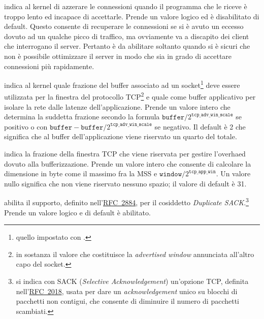 \begin{basedescript}{\desclabelwidth{2.2cm}\desclabelstyle{\nextlinelabel}}

\item[\sysctlrelfiled{net/ipv4}{tcp\_abort\_on\_overflow}] indica al
  kernel di azzerare le connessioni quando il programma che le riceve è troppo
  lento ed incapace di accettarle. Prende un valore logico ed è disabilitato
  di default.  Questo consente di recuperare le connessioni se si è avuto un
  eccesso dovuto ad un qualche picco di traffico, ma ovviamente va a discapito
  dei client che interrogano il server. Pertanto è da abilitare soltanto
  quando si è sicuri che non è possibile ottimizzare il server in modo che sia
  in grado di accettare connessioni più rapidamente.

\item[\sysctlrelfiled{net/ipv4}{tcp\_adv\_win\_scale}] indica al kernel quale
  frazione del buffer associato ad un socket\footnote{quello impostato con
    .} deve essere utilizzata per la
  finestra del protocollo TCP\footnote{in sostanza il valore che costituisce
    la \textit{advertised window} annunciata all'altro capo del socket.} e
  quale come buffer applicativo per isolare la rete dalle latenze
  dell'applicazione.  Prende un valore intero che determina la suddetta
  frazione secondo la formula
  $\texttt{buffer}/2^\texttt{tcp\_adv\_win\_scale}$ se positivo o con
  $\texttt{buffer}-\texttt{buffer}/2^\texttt{tcp\_adv\_win\_scale}$ se
  negativo.  Il default è 2 che significa che al buffer dell'applicazione
  viene riservato un quarto del totale.

\item[\sysctlrelfiled{net/ipv4}{tcp\_app\_win}] indica la frazione della
  finestra TCP che viene riservata per gestire l'overhaed dovuto alla
  bufferizzazione. Prende un valore intero che consente di calcolare la
  dimensione in byte come il massimo fra la MSS e
  $\texttt{window}/2^\texttt{tcp\_app\_win}$. Un valore nullo significa che
  non viene riservato nessuno spazio; il valore di default è 31.


\item[\sysctlrelfiled{net/ipv4}{tcp\_dsack}] abilita il supporto,
  definito nell'\href{http://www.ietf.org/rfc/rfc2884.txt}{RFC~2884}, per il
  cosiddetto \textit{Duplicate SACK}.\footnote{si indica con SACK
    (\textit{Selective Acknowledgement}) un'opzione TCP, definita
    nell'\href{http://www.ietf.org/rfc/rfc2018.txt}{RFC~2018}, usata per dare
    un \textit{acknowledgement} unico su blocchi di pacchetti non contigui,
    che consente di diminuire il numero di pacchetti scambiati.} Prende un
  valore logico e di default è abilitato.



\end{basedescript}
